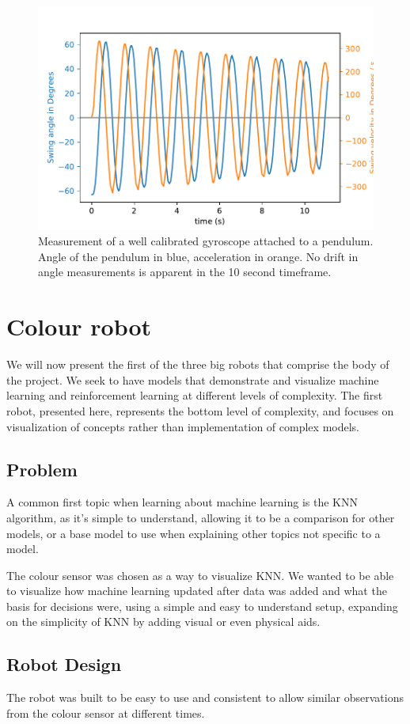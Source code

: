 \documentclass[11pt, a4paper]{article}
\begin{document}
	\begin{figure}[H]
		\centering
		\includegraphics[width=0.6\linewidth]{images/pendulum}
		\caption{Measurement of a well calibrated gyroscope attached to a pendulum. Angle of the pendulum in blue, acceleration in orange. No drift in angle measurements is apparent in the 10 second timeframe.}
		\label{fig:pendulum}
	\end{figure}
	
	
	\pagebreak
	\section{Colour robot}
	We will now present the first of the three big robots that comprise the body of the project. We seek to have models that demonstrate and visualize machine learning and reinforcement learning at different levels of complexity. The first robot, presented here, represents the bottom level of complexity, and focuses on visualization of concepts rather than implementation of complex models.
	\subsection{Problem}
	A common first topic when learning about machine learning is the KNN algorithm, as it's simple to understand, allowing it to be a comparison for other models, or a base model to use when explaining other topics not specific to a model.
	
	The colour sensor was chosen as a way to visualize KNN. We wanted to be able to visualize how machine learning updated after data was added and what the basis for decisions were, using a simple and easy to understand setup, expanding on the simplicity of KNN by adding visual or even physical aids.
	\subsection{Robot Design}
	The robot was built to be easy to use and consistent to allow similar observations from the colour sensor at different times.
	
\end{document}
